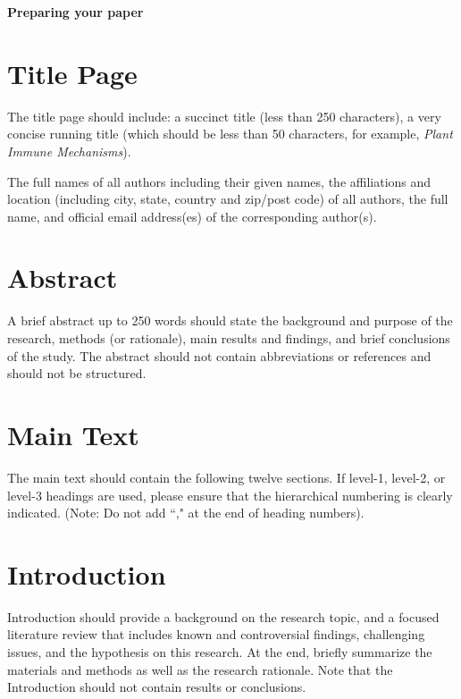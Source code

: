 \documentclass[12pt,a4paper]{article}
\begin{document}
\begin{center}
    \textbf{\LARGE Preparing your paper}
\end{center}

\section*{Title Page}

The title page should include: a succinct title (less than 250 characters), a very concise running title (which should be less than 50 characters, for example, \textit{Plant Immune Mechanisms}).

The full names of all authors including their given names, the affiliations and location (including city, state, country and zip/post code) of all authors, the full name, and official email address(es) of the corresponding author(s).

\section*{Abstract}

A brief abstract up to 250 words should state the background and purpose of the research, methods (or rationale), main results and findings, and brief conclusions of the study. The abstract should not contain abbreviations or references and should not be structured.

\newpage
\section*{Main Text}

The main text should contain the following twelve sections. If level-1, level-2, or level-3 headings are used, please ensure that the hierarchical numbering is clearly indicated. (Note: Do not add “," at the end of heading numbers).

\vspace{1em}
\tableofcontents
\newpage

\section{Introduction}
Introduction should provide a background on the research topic, and a focused literature review that includes known and controversial findings, challenging issues, and the hypothesis on this research. At the end, briefly summarize the materials and methods as well as the research rationale. Note that the Introduction should not contain results or conclusions. 
\end{document}
